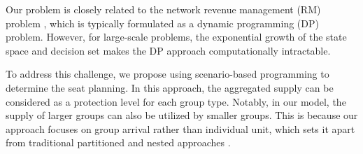 
Our problem is closely related to the network revenue management (RM) problem \cite{williamson1992airline}, which is typically formulated as a dynamic programming (DP) problem. However, for large-scale problems, the exponential growth of the state space and decision set makes the DP approach computationally intractable. 

To address this challenge, we propose using scenario-based programming \cite{feng2013scenario, casey2005scenario, henrion2018problem} to determine the seat planning. In this approach, the aggregated supply can be considered as a protection level for each group type. Notably, in our model, the supply of larger groups can also be utilized by smaller groups. This is because our approach focuses on group arrival rather than individual unit, which sets it apart from traditional partitioned and nested approaches \cite{curry1990optimal, van2008simulation}.








